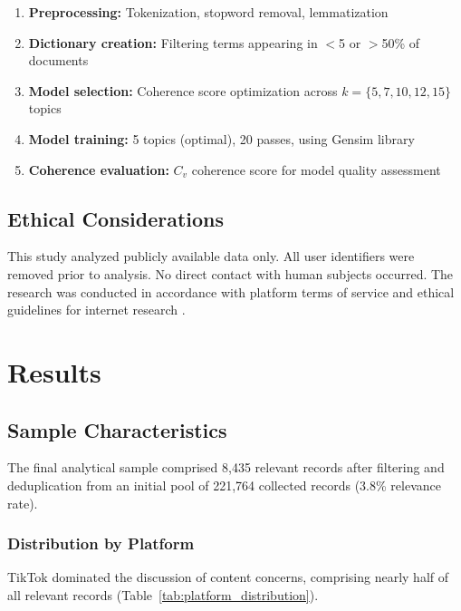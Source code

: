 \documentclass[12pt,a4paper]{article}
\begin{document}
\begin{enumerate}[leftmargin=*, itemsep=0.3em]
    \item \textbf{Preprocessing:} Tokenization, stopword removal, lemmatization
    \item \textbf{Dictionary creation:} Filtering terms appearing in $<$5 or $>$50\% of documents
    \item \textbf{Model selection:} Coherence score optimization across $k = \{5, 7, 10, 12, 15\}$ topics
    \item \textbf{Model training:} 5 topics (optimal), 20 passes, using Gensim library
    \item \textbf{Coherence evaluation:} $C_v$ coherence score for model quality assessment \citep{mimno2011optimizing}
\end{enumerate}

\subsection{Ethical Considerations}

This study analyzed publicly available data only. All user identifiers were removed prior to analysis. No direct contact with human subjects occurred. The research was conducted in accordance with platform terms of service and ethical guidelines for internet research \citep{zimmer2010but, salganik2019bit}.

\section{Results}

\subsection{Sample Characteristics}

The final analytical sample comprised 8,435 relevant records after filtering and deduplication from an initial pool of 221,764 collected records (3.8\% relevance rate).

\subsubsection{Distribution by Platform}

TikTok dominated the discussion of content concerns, comprising nearly half of all relevant records (Table~\ref{tab:platform_distribution}).
\end{document}
